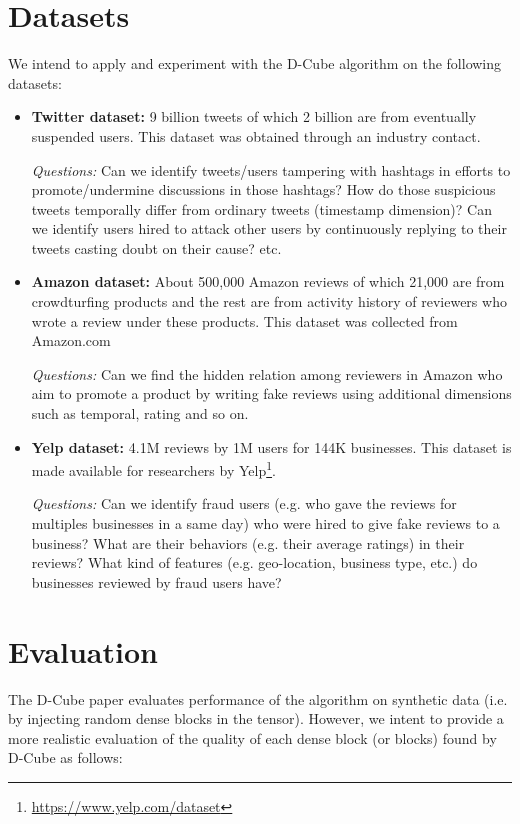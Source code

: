 \documentclass[10pt,twocolumn]{article}
\begin{document}
\section{Datasets}
We intend to apply and experiment with the D-Cube algorithm on the following datasets:
\begin{itemize}
\item \textbf{Twitter dataset:} 9 billion tweets of which 2 billion are from eventually suspended users. This dataset was obtained through an industry contact.

\emph{Questions:} Can we identify tweets/users tampering with hashtags in efforts to promote/undermine discussions in those hashtags? How do those suspicious tweets temporally differ from ordinary tweets (timestamp dimension)? Can we identify users hired to attack other users by continuously replying to their tweets casting doubt on their cause? etc. 

\item \textbf{Amazon dataset:} About 500,000 Amazon reviews of which 21,000 are from crowdturfing products and the rest are from activity history of reviewers who wrote a review under these products. This dataset was collected from Amazon.com

\emph{Questions:} Can we find the hidden relation among reviewers in Amazon who aim to promote a product by writing fake reviews using additional dimensions such as temporal, rating and so on.

\item \textbf{Yelp dataset:} 4.1M reviews by 1M users for 144K businesses. This dataset is made available for researchers by Yelp\footnote{\href{https://www.yelp.com/dataset}{https://www.yelp.com/dataset}}.

\emph{Questions:} Can we identify fraud users (e.g. who gave the reviews for multiples businesses in a same day) who were hired to give fake reviews to a business? What are their behaviors (e.g. their average ratings) in their reviews? What kind of features (e.g. geo-location, business type, etc.) do businesses reviewed by fraud users have?
\end{itemize}

\section{Evaluation}
The D-Cube paper \cite{shin2017d} evaluates performance of the algorithm on synthetic data (i.e. by injecting random dense blocks in the tensor). However, we intent to provide a more realistic evaluation of the quality of each dense block (or blocks) found by D-Cube as follows:
\end{document}
